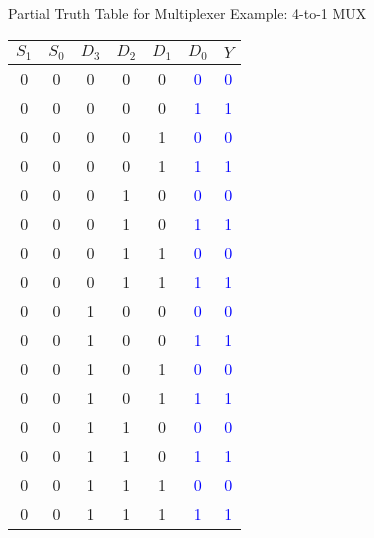 \begin{frame}{Partial Truth Table for Multiplexer}
Example: 4-to-1 MUX
\begin{multicols}{2}
    \begin{center}
\small
		\begin{tabular}{cc|cccc|c}
		 $S_1$ & $S_0$ & $D_3$ & $D_2$ &$D_1$ & $D_0$ & $Y$\\\hline
   0 & 0 & 0 & 0 & 0 & \textcolor{blue}{0} & \textcolor{blue}{0} \\
   0 & 0 & 0 & 0 & 0 & \textcolor{blue}{1} & \textcolor{blue}{1} \\
   0 & 0 & 0 & 0 & 1 & \textcolor{blue}{0} & \textcolor{blue}{0} \\
   0 & 0 & 0 & 0 & 1& \textcolor{blue}{1} & \textcolor{blue}{1} \\
   0 & 0 & 0 & 1 & 0 & \textcolor{blue}{0} & \textcolor{blue}{0} \\
    0 & 0 & 0 & 1 & 0 & \textcolor{blue}{1} & \textcolor{blue}{1} \\
    0 & 0 & 0 & 1 & 1 & \textcolor{blue}{0} & \textcolor{blue}{0} \\
    0 & 0 & 0 & 1 & 1 & \textcolor{blue}{1} & \textcolor{blue}{1} \\
   \hline
   0 & 0 & 1 & 0 & 0 & \textcolor{blue}{0} & \textcolor{blue}{0} \\
   0 & 0 & 1 & 0 & 0 & \textcolor{blue}{1} & \textcolor{blue}{1} \\
   0 & 0 & 1 & 0 & 1 & \textcolor{blue}{0} & \textcolor{blue}{0} \\
   0 & 0 & 1 & 0 & 1& \textcolor{blue}{1} & \textcolor{blue}{1} \\
   0 & 0 & 1 & 1 & 0 & \textcolor{blue}{0} & \textcolor{blue}{0} \\
    0 & 0 & 1 & 1 & 0 & \textcolor{blue}{1} & \textcolor{blue}{1} \\
    0 & 0 & 1 & 1 & 1 & \textcolor{blue}{0} & \textcolor{blue}{0} \\
    0 & 0 & 1 & 1 & 1 & \textcolor{blue}{1} & \textcolor{blue}{1} \\
    \hline
		\end{tabular}
		\end{center}

  \columnbreak


\end{multicols}
\end{frame}
